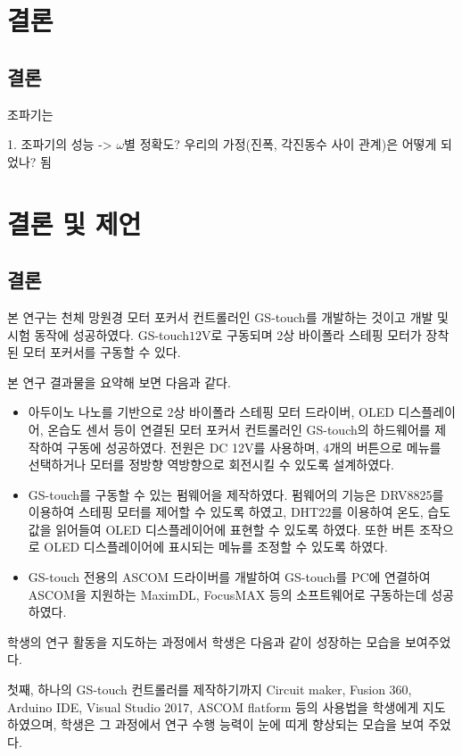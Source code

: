 \section{결론}
\subsection{결론}

조파기는 

1. 조파기의 성능 ->
$\omega$별 정확도?
우리의 가정(진폭, 각진동수 사이 관계)은 어떻게 되었나?
됨


\section{결론 및 제언}

\subsection{결론}
	
본 연구는 천체 망원경 모터 포커서 컨트롤러인 GS-touch를 개발하는 것이고 개발 및 시험 동작에 성공하였다.  GS-touch\는 $12 \textrm{V}$로 구동되며 2상 바이폴라 스테핑 모터가 장착된 모터 포커서를 구동할 수 있다. 


본 연구 결과물을 요약해 보면 다음과 같다. 

\begin{itemize}
	\item 아두이노 나노를 기반으로 2상 바이폴라 스테핑 모터 드라이버, OLED 디스플레이어, 온습도 센서 등이 연결된 모터 포커서 컨트롤러인 GS-touch의 하드웨어를 제작하여 구동에 성공하였다. 전원은 DC 12V를 사용하며, 4개의 버튼으로 메뉴를 선택하거나 모터를 정방향 역방향으로 회전시킬 수 있도록 설계하였다.
	\item GS-touch를 구동할 수 있는 펌웨어을 제작하였다. 펌웨어의 기능은 DRV8825를 이용하여 스테핑 모터를 제어할 수 있도록 하였고, DHT22를 이용하여 온도, 습도 값을 읽어들여 OLED 디스플레이어에 표현할 수 있도록 하였다. 또한 버튼 조작으로 OLED 디스플레이어에 표시되는 메뉴를 조정할 수 있도록 하였다. 
	\item  GS-touch 전용의 ASCOM 드라이버를 개발하여 GS-touch를 PC에 연결하여 ASCOM을 지원하는 MaximDL, FocusMAX 등의 소프트웨어로 구동하는데 성공하였다.
\end{itemize}

학생의 연구 활동을 지도하는 과정에서 학생은 다음과 같이 성장하는 모습을 보여주었다. 

첫째, 하나의 GS-touch 컨트롤러를 제작하기까지 Circuit maker, Fusion 360, Arduino IDE, Visual Studio 2017, ASCOM flatform 등의 사용법을 학생에게 지도하였으며, 학생은 그 과정에서 연구 수행 능력이 눈에 띠게 향상되는 모습을 보여 주었다. 

